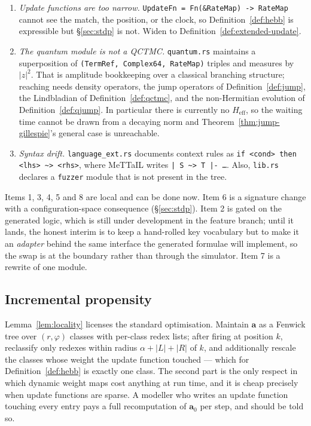 \documentclass[11pt,a4paper]{article}
\theoremstyle{plain}
\theoremstyle{definition}
\theoremstyle{remark}
\newcommand{\Rnn}{\mathbb{R}_{\geq 0}}
\newcommand{\prop}{\mathbf{a}}
\newcommand{\Heff}{H_{\mathrm{eff}}}
\begin{document}
\begin{enumerate}[leftmargin=2.2em]
$\Rnn$; the clamping additionally makes $\prop_0$ wrong whenever two classes are simultaneously
enabled with rates summing above $1$.
\item \emph{Update functions are too narrow.} \texttt{UpdateFn = Fn(\&RateMap) -> RateMap} cannot see
the match, the position, or the clock, so Definition~\ref{def:hebb} is expressible but
\S\ref{sec:stdp} is not. Widen to Definition~\ref{def:extended-update}.
\item \emph{The quantum module is not a QCTMC.} \texttt{quantum.rs} maintains a
superposition of \texttt{(TermRef,}\allowbreak\ \texttt{Complex64,}\allowbreak\ \texttt{RateMap)}
triples and measures by $|z|^2$. That is amplitude
bookkeeping over a classical branching structure; reaching \cite{qctmc} needs density operators, the
jump operators of Definition~\ref{def:jump}, the Lindbladian of Definition~\ref{def:qctmc}, and the
non-Hermitian evolution of Definition~\ref{def:qjump}. In particular there is currently no $\Heff$,
so the waiting time cannot be drawn from a decaying norm and
Theorem~\ref{thm:jump-gillespie}'s general case is unreachable.
\item \emph{Syntax drift.} \texttt{language\_ext.rs} documents context rules as
\texttt{if <cond> then <lhs> \textasciitilde> <rhs>}, where MeTTaIL writes
\texttt{| S \textasciitilde> T |- \dots}. Also, \texttt{lib.rs} declares a \texttt{fuzzer} module
that is not present in the tree.
\end{enumerate}

Items 1, 3, 4, 5 and 8 are local and can be done now. Item 6 is a signature change with a
configuration-space consequence (\S\ref{sec:stdp}). Item 2 is gated on the generated logic, which is
still under development in the feature branch; until it lands, the honest interim is to keep a
hand-rolled key vocabulary but to make it an \emph{adapter} behind the same interface the generated
formulae will implement, so the swap is at the boundary rather than through the simulator. Item 7 is
a rewrite of one module.

\subsection{Incremental propensity}

Lemma~\ref{lem:locality} licenses the standard optimisation. Maintain $\prop$ as a Fenwick tree over
$(r,\varphi)$ classes with per-class redex lists; after firing at position $k$, reclassify only
redexes within radius $\alpha + |L| + |R|$ of $k$, and additionally rescale the classes whose weight
the update function touched --- which for Definition~\ref{def:hebb} is exactly one class. The second
part is the only respect in which dynamic weight maps cost anything at run time, and it is cheap
precisely when update functions are sparse. A modeller who writes an update function touching every
entry pays a full recomputation of $\prop_0$ per step, and should be told so.
\end{document}
